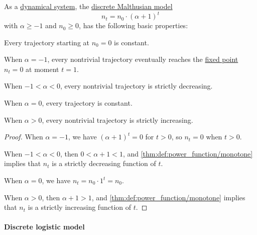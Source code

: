 \begin{proposition}\label{thm:discrete_malthusian_model_dynamics}
  As a \hyperref[def:dynamical_system]{dynamical system}, the \hyperref[def:discrete_malthusian_model]{discrete Malthusian model}
  \begin{equation*}
    n_t = n_0 \cdot (\alpha + 1)^t
  \end{equation*}
  with \( \alpha \geq -1 \) and \( n_0 \geq 0 \), has the following basic properties:
  \begin{thmenum}
     Every trajectory starting at \( n_0 = 0 \) is constant.

     When \( \alpha = -1 \), every nontrivial trajectory eventually reaches the \hyperref[def:dynamical_system_fixed_point]{fixed point} \( n_t = 0 \) at moment \( t = 1 \).

     When \( -1 < \alpha < 0 \), every nontrivial trajectory is strictly decreasing.

     When \( \alpha = 0 \), every trajectory is constant.

     When \( \alpha > 0 \), every nontrivial trajectory is strictly increasing.
  \end{thmenum}
\end{proposition}
\begin{proof}
   When \( \alpha = -1 \), we have \( (\alpha + 1)^t = 0 \) for \( t > 0 \), so \( n_t = 0 \) when \( t > 0 \).

   When \( -1 < \alpha < 0 \), then \( 0 < \alpha + 1 < 1 \), and \cref{thm:def:power_function/monotone} implies that \( n_t \) is a strictly decreasing function of \( t \).

   When \( \alpha = 0 \), we have \( n_t = n_0 \cdot 1^t = n_0 \).

   When \( \alpha > 0 \), then \( \alpha + 1 > 1 \), and \cref{thm:def:power_function/monotone} implies that \( n_t \) is a strictly increasing function of \( t \).
\end{proof}

\paragraph{Discrete logistic model}

